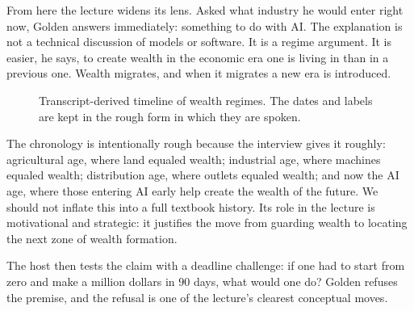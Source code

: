From here the lecture widens its lens. Asked what industry he would enter right now, Golden answers immediately: something to do with AI. The explanation is not a technical discussion of models or software. It is a regime argument. It is easier, he says, to create wealth in the economic era one is living in than in a previous one. Wealth migrates, and when it migrates a new era is introduced.

\begin{figure}[h]
\centering
{}
\caption{Transcript-derived timeline of wealth regimes. The dates and labels are kept in the rough form in which they are spoken.}
\end{figure}

The chronology is intentionally rough because the interview gives it roughly: agricultural age, where land equaled wealth; industrial age, where machines equaled wealth; distribution age, where outlets equaled wealth; and now the AI age, where those entering AI early help create the wealth of the future. We should not inflate this into a full textbook history. Its role in the lecture is motivational and strategic: it justifies the move from guarding wealth to locating the next zone of wealth formation.

The host then tests the claim with a deadline challenge: if one had to start from zero and make a million dollars in \(90\) days, what would one do? Golden refuses the premise, and the refusal is one of the lecture's clearest conceptual moves.

